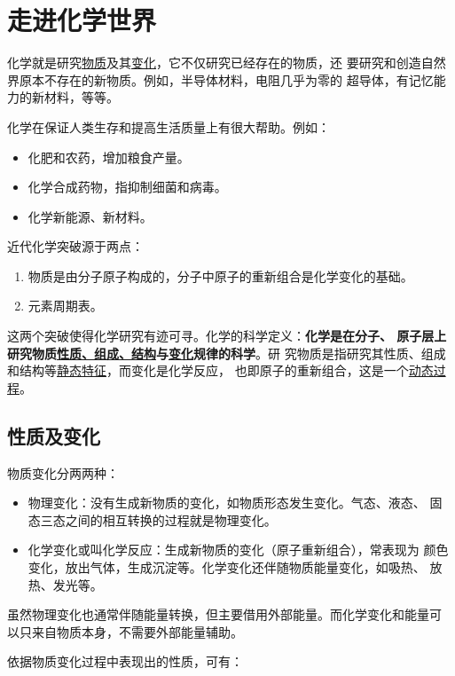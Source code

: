 \chapter{走进化学世界}

化学就是研究\uline{物质}及其\uline{变化}，它不仅研究已经存在的物质，还
要研究和创造自然界原本不存在的新物质。例如，半导体材料，电阻几乎为零的
超导体，有记忆能力的新材料，等等。

化学在保证人类生存和提高生活质量上有很大帮助。例如：

\begin{itemize}
\item 化肥和农药，增加粮食产量。
\item 化学合成药物，指抑制细菌和病毒。
\item 化学新能源、新材料。
\end{itemize}

近代化学突破源于两点：

\begin{enumerate}
\item 物质是由分子原子构成的，分子中原子的重新组合是化学变化的基础。
\item 元素周期表。
\end{enumerate}

这两个突破使得化学研究有迹可寻。化学的科学定义：\textbf{化学是在分子、
  原子层上研究物质\uline{性质、组成、结构}与\uline{变化}规律的科学}。研
究物质是指研究其性质、组成和结构等\uline{静态特征}，而变化是化学反应，
也即原子的重新组合，这是一个\uline{动态过程}。

\section{性质及变化}

物质变化分两两种：

\begin{itemize}
\item 物理变化：没有生成新物质的变化，如物质形态发生变化。气态、液态、
  固态三态之间的相互转换的过程就是物理变化。
\item 化学变化或叫化学反应：生成新物质的变化（原子重新组合），常表现为
  颜色变化，放出气体，生成沉淀等。化学变化还伴随物质能量变化，如吸热、
  放热、发光等。
\end{itemize}

虽然物理变化也通常伴随能量转换，但主要借用外部能量。而化学变化和能量可
以只来自物质本身，不需要外部能量辅助。

依据物质变化过程中表现出的性质，可有：

